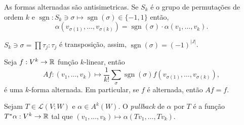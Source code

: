 \begin{corollary}
    As formas alternadas são antisimetricas. Se \(S_k\) é o grupo de permutações de ordem \(k\) e \(\operatorname{sgn} : S_k \ni \sigma \mapsto \operatorname{sgn}(\sigma) \in \{-1, 1\}\) então,
    \[\alpha(v_{\sigma(1)}, \ldots, v_{\sigma(k)}) = \operatorname{sgn}(\sigma) \cdot \alpha(v_1, \ldots, v_{k}) .\] 
\end{corollary}

\begin{note} 
    \(S_k \ni \sigma = \prod \tau_j : \tau_j\) é transposição, assim, \(\operatorname{sgn}(\sigma) = (-1)^{|J|}\).
\end{note}


\begin{exercise}
    Seja \(f: V^k \to \mathbb{R}\) função $k$-linear, então 
    \[Af :  (v_1, \ldots, v_k) \mapsto \frac{1}{k!} \sum_{\sigma} \operatorname{sgn}(\sigma) f(v_{\sigma(1)}, \ldots, v_{\sigma(k)}),\] 
    é uma $k$-forma alternada. Em particular, se \(f\) é alternada, então \(Af = f \). 
\end{exercise}

\begin{definition}
    Sejam \(T \in \mathcal{L}(V;W)\) e \(\alpha \in A^k(W)\). O \emph{pullback} de \(\alpha \) por \(T\) é a função \(T^*\alpha: V^k \to \mathbb{R}\) tal que \((v_1, \ldots, v_k) \mapsto \alpha (Tv_1, \ldots, Tv_k)\). 
\end{definition}


\let\originalwedge\wedge 
\renewcommand{\wedge}{\mathbin{\scriptstyle\originalwedge}}


